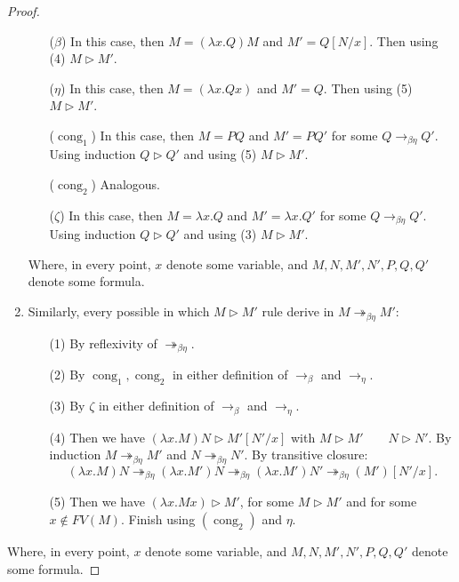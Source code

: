 \begin{proof}
\begin{enumerate}
    \begin{itemize}
    \item[($\beta$)] In this case, then $M=(\lambda x.Q)M$ and $M' = Q[N/x]$. Then using (4) $M \triangleright M'$.
    \item[($\eta$)] In this case, then $M=(\lambda x.Qx)$ and $M' = Q$. Then using (5) $M \triangleright M'$.
    \item[($\operatorname{cong}_1$)] In this case, then $M=PQ$ and $M' = PQ'$ for some $Q\to_{\beta\eta} Q'$. Using induction $Q\triangleright Q'$ and using (5) $M \triangleright M'$. 
    \item[($\operatorname{cong}_2$)]  Analogous.
    \item[($\zeta$)] In this case, then $M=\lambda x.Q$ and $M' = \lambda x.Q'$ for some $Q\to_{\beta\eta} Q'$. Using induction $Q\triangleright Q'$ and using (3) $M \triangleright M'$.  
    \end{itemize}
    Where, in every point, $x$ denote some variable, and $M,N,M',N',P,Q,Q'$ denote some formula.
  \item Similarly, every possible in which $M\triangleright M'$ rule derive in  $M \twoheadrightarrow_{\beta\eta} M'$:
    \begin{itemize}
    \item[(1)] By reflexivity of $ \twoheadrightarrow_{\beta\eta}$.
    \item[(2)] By $\operatorname{cong}_1,\operatorname{cong}_2$ in either definition of $\to_\beta$ and $\to_\eta$.
    \item[(3)] By $\zeta$ in either definition of $\to_\beta$ and $\to_\eta$.
    \item[(4)] Then we have $(\lambda x.M)N \triangleright M'[N'/x]$ with $M \triangleright M'\qquad N \triangleright N'$. By induction $M \twoheadrightarrow_{\beta\eta} M'$ and $N \twoheadrightarrow_{\beta\eta} N'$. By transitive closure:
      $$(\lambda x.M)N \twoheadrightarrow_{\beta\eta}(\lambda x.M')N \twoheadrightarrow_{\beta\eta} (\lambda x.M')N' \twoheadrightarrow_{\beta\eta} (M')[N'/x].$$
    \item[(5)] Then we have $(\lambda x.Mx) \triangleright M'$, for some $M\triangleright M'$ and for some $x \not  \in FV(M)$. Finish using $(\operatorname{cong}_2)$ and $\eta$.
    \end{itemize}

  \end{enumerate}
      Where, in every point, $x$ denote some variable, and $M,N,M',N',P,Q,Q'$ denote some formula.
\end{proof}

